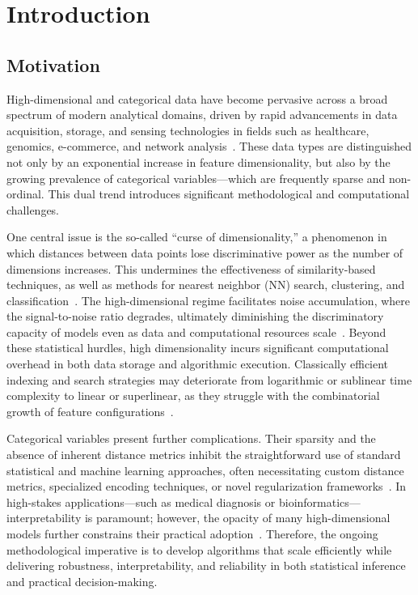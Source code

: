 \section{Introduction}

\subsection{Motivation}

High-dimensional and categorical data have become pervasive across a broad spectrum of modern analytical domains, driven by rapid advancements in data acquisition, storage, and sensing technologies in fields such as healthcare, genomics, e-commerce, and network analysis~\cite{ref1,ref2,ref5,ref6,ref11,ref12,ref30,ref32,ref36,ref37,ref38,ref39,ref42,ref43,ref46,ref52,ref71,ref72,ref73,ref76,ref90,ref93,ref96,ref110}. These data types are distinguished not only by an exponential increase in feature dimensionality, but also by the growing prevalence of categorical variables—which are frequently sparse and non-ordinal. This dual trend introduces significant methodological and computational challenges.

One central issue is the so-called ``curse of dimensionality,'' a phenomenon in which distances between data points lose discriminative power as the number of dimensions increases. This undermines the effectiveness of similarity-based techniques, as well as methods for nearest neighbor (NN) search, clustering, and classification~\cite{ref1,ref5,ref12,ref36,ref76,ref110}. The high-dimensional regime facilitates noise accumulation, where the signal-to-noise ratio degrades, ultimately diminishing the discriminatory capacity of models even as data and computational resources scale~\cite{ref12,ref36,ref39,ref46}. Beyond these statistical hurdles, high dimensionality incurs significant computational overhead in both data storage and algorithmic execution. Classically efficient indexing and search strategies may deteriorate from logarithmic or sublinear time complexity to linear or superlinear, as they struggle with the combinatorial growth of feature configurations~\cite{ref2,ref5,ref32,ref43,ref90}.

Categorical variables present further complications. Their sparsity and the absence of inherent distance metrics inhibit the straightforward use of standard statistical and machine learning approaches, often necessitating custom distance metrics, specialized encoding techniques, or novel regularization frameworks~\cite{ref39,ref52,ref71,ref72,ref73,ref93}. In high-stakes applications—such as medical diagnosis or bioinformatics—interpretability is paramount; however, the opacity of many high-dimensional models further constrains their practical adoption~\cite{ref11,ref37,ref46,ref96,ref110}. Therefore, the ongoing methodological imperative is to develop algorithms that scale efficiently while delivering robustness, interpretability, and reliability in both statistical inference and practical decision-making.


